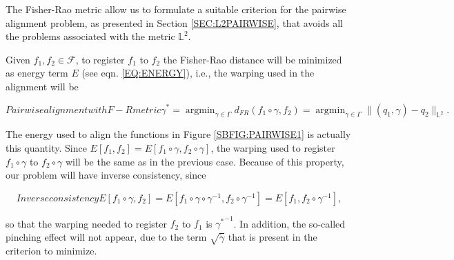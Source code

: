 
The Fisher-Rao metric allow us to formulate a suitable criterion for the
pairwise alignment problem, as presented in Section \ref{SEC:L2PAIRWISE},
 that avoids all the problems associated with the metric $\mathbb{L}^2$.

Given $f_1, f_2 \in \mathcal{F}$, to register $f_1$ to $f_2$ the Fisher-Rao distance
will be minimized as energy term $E$ (see eqn. \ref{EQ:ENERGY}), i.e.,
the warping used in the alignment will be

\begin{equation}[EQ:DPAELASTIC]{Pairwise alignment with F-R metric}
\gamma^{*}= \operatorname{argmin}_{\gamma \in \Gamma} d_{FR}(f_1 \circ \gamma,
f_2) = \operatorname{argmin}_{\gamma \in \Gamma} \|
(q_1, \gamma) - q_2 \|_{\mathbb{L}^2}.
\end{equation}

The energy used to align the functions in Figure \ref{SBFIG:PAIRWISE1} is
actually this quantity.
Since
$E[f_1, f_2] = E[f_1 \circ \gamma, f_2 \circ \gamma]$, the warping used to
register $f_1 \circ \gamma$ to $f_2 \circ \gamma$ will be the same as in the
previous case.
Because of this property, our problem will have inverse consistency, since

\begin{equation}[]{Inverse consistency}
E[f_1 \circ \gamma, f_2] = E[f_1 \circ \gamma \circ \gamma^{-1}, f_2
\circ \gamma^{-1}] = E[f_1, f_2 \circ \gamma^{-1}],
\end{equation}

so that the warping needed to register $f_2$ to $f_1$  is ${\gamma^*}^{-1}$.
In addition, the so-called pinching effect will not appear, due to the term
$\sqrt{\dot \gamma}$ that is present in the criterion to minimize.


